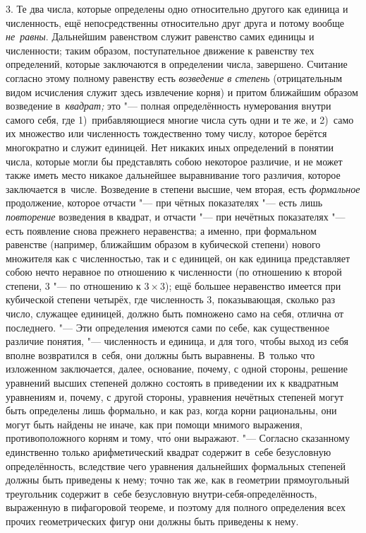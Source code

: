 3. Те два числа, которые определены одно относительно другого как единица и
численность, ещё непосредственны относительно друг друга и потому вообще
{\em не~равны}. Дальнейшим равенством служит равенство самих единицы и численности;
таким образом, поступательное движение к равенству тех определений, которые
заключаются в определении числа, завершено. Считание согласно этому полному
равенству есть {\em возведение в степень} (отрицательным видом исчисления
служит здесь извлечение корня) и притом ближайшим образом возведение
в~{\em квадрат;} это "--- полная определённость нумерования внутри самого
себя, где 1)~прибавляющиеся многие числа суть одни и те же, и 2)~само
их множество или численность тождественно тому числу, которое берётся
многократно и служит единицей. Нет никаких иных определений в понятии числа,
которые могли бы представлять собою некоторое различие, и не может также иметь
место никакое дальнейшее выравнивание того различия, которое заключается
в~числе. Возведение в степени высшие, чем вторая, есть {\em формальное}
продолжение, которое отчасти "--- при чётных показателях "--- есть лишь
{\em повторение} возведения в квадрат, и отчасти "--- при нечётных показателях
"--- есть появление снова прежнего неравенства; а именно, при формальном
равенстве (например, ближайшим образом в кубической степени) нового множителя
как с численностью, так и с единицей, он как единица представляет собою нечто
неравное по отношению к численности (по отношению к второй степени, 3 "--- по
отношению к $3\times 3$); ещё большее неравенство имеется при кубической
степени четырёх, где численность 3, показывающая, сколько раз число, служащее
единицей, должно быть помножено само на себя, отлична от последнего. "--- Эти
определения имеются сами по себе, как существенное различие понятия, "---
численность и единица, и для того, чтобы выход из себя вполне возвратился
в~себя, они должны быть выравнены. В~только что изложенном заключается, далее,
основание, почему, с одной стороны, решение уравнений высших степеней должно
состоять в приведении их к квадратным уравнениям и, почему, с другой стороны,
уравнения нечётных степеней могут быть определены лишь формально, и как раз,
когда корни рациональны, они могут быть найдены не иначе, как при помощи мнимого
выражения, противоположного корням и тому, чт\'{о} они выражают. "--- Согласно
сказанному единственно только арифметический квадрат
содержит в~себе безусловную определённость, вследствие чего уравнения дальнейших
формальных степеней должны быть приведены к нему; точно так же, как в геометрии
прямоугольный треугольник содержит в~себе безусловную внутри-себя-определённость,
выраженную в пифагоровой теореме, и поэтому для полного определения всех прочих
геометрических фигур они должны быть приведены к нему.

